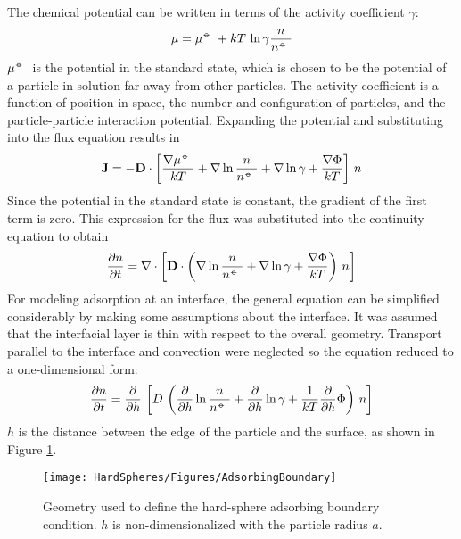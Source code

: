 The chemical potential can be written in terms of the activity coefficient
$\gamma$:\begin{equation} \label{eq:ChemicalPotential}
\mu = \mu^\standardstate + kT \, \ln \gamma \frac{n}{n^ \standardstate}
\end{equation}\( \mu^\standardstate \) is the potential in the standard state,
which is chosen to be the potential of a particle in solution far
away from other particles. The activity coefficient is a function
of position in space, the number and configuration of particles, and
the particle-particle interaction potential. Expanding the potential
and substituting into the flux equation results in \begin{equation} \label{eq:Flux ito Potential}
\mathbf{J} = -\mathbf{D} \cdot \left[ \frac{\nabla \mu^\standardstate}{kT}
 + \nabla \ln \frac{n}{n^\standardstate} + \nabla \ln \gamma
 + \frac{\nabla \Phi}{kT}
 \right] \, n
\end{equation}Since the potential in the standard state is constant, the gradient
of the first term is zero. This expression for the flux was substituted
into the continuity equation to obtain\begin{equation} \label{eq:PDE 1}
\frac{\partial n}{ \partial t} =
 \nabla \cdot \left[ \mathbf{D} \cdot \left(
 \nabla \ln \frac{n}{n^\standardstate}
 + \nabla \ln \gamma + \frac{\nabla \Phi}{kT}
 \right) \, n \right]
\end{equation}For modeling adsorption at an interface, the general equation can
be simplified considerably by making some assumptions about the interface.
It was assumed that the interfacial layer is thin with respect to
the overall geometry. Transport parallel to the interface and convection
were neglected so the equation reduced to a one-dimensional form:\begin{equation} \label{eq:PDE 2}
\frac{\partial n}{ \partial t} =
 \frac{\partial}{ \partial h} \, \left[ D \, 
 \left(
 \frac{\partial}{ \partial h} \ln \frac{n}{n^\standardstate} 
 + \frac{\partial}{ \partial h} \ln \gamma
 + \frac{1}{kT} \frac{\partial}{ \partial h} \Phi
 \right) \, n \right]
\end{equation}$h$ is the distance between the edge of the particle and the surface,
as shown in Figure \ref{fig:Geometry}. %
\begin{figure}
\texttt{[image: HardSpheres/Figures/AdsorbingBoundary]}

\caption{\label{fig:Geometry}Geometry used to define the hard-sphere adsorbing
boundary condition. $h$ is non-dimensionalized with the particle
radius $a$.}


%
\end{figure}


